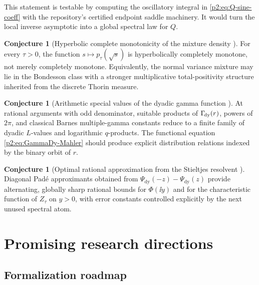 \documentclass[11pt]{article}
\theoremstyle{definition}
\newtheorem{conjecture}[theorem]{Conjecture}
\theoremstyle{remark}
\begin{document}
This statement is testable by computing the oscillatory integral in
\eqref{p2:eq:Q-sine-coeff} with the repository's certified endpoint saddle machinery.  It would
turn the local inverse asymptotic into a global spectral law for $Q$.

\begin{conjecture}[Hyperbolic complete monotonicity of the mixture density \Conj]
For every $\tau>0$, the function $s\mapsto p_\tau(\sqrt s)$ is hyperbolically completely
monotone, not merely completely monotone.  Equivalently, the normal variance mixture may lie
in the Bondesson class with a stronger multiplicative total-positivity structure inherited
from the discrete Thorin measure.
\end{conjecture}

\begin{conjecture}[Arithmetic special values of the dyadic gamma function \Conj]
At rational arguments with odd denominator, suitable products of
$\Gamma_{\!\mathrm{dy}}(r)$, powers of $2\pi$, and classical Barnes multiple-gamma constants reduce to a
finite family of dyadic $L$-values and logarithmic $q$-products.  The functional equation
\eqref{p2:eq:GammaDy-Mahler} should produce explicit distribution relations indexed by the
binary orbit of $r$.
\end{conjecture}

\begin{conjecture}[Optimal rational approximation from the Stieltjes resolvent \Conj]
Diagonal Pad\'e approximants obtained from
\(
 \Psi_{\mathrm{dy}}(-z)-\Psi_{\mathrm{dy}}(z)
\)
provide alternating, globally sharp rational bounds for $\Phi(\ii y)$ and for the
characteristic function of $Z_\tau$ on $y>0$, with error constants controlled explicitly by
the next unused spectral atom.
\end{conjecture}

\section{Promising research directions}
\label{p2:sec:future}

\subsection{Formalization roadmap}
\end{document}
